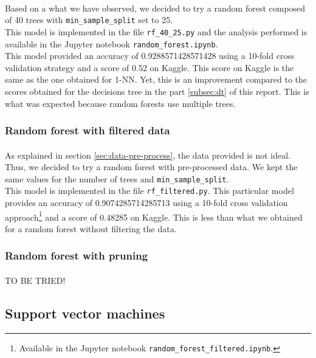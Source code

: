 \documentclass[a4paper, 11pt, oneside]{article}
\begin{document}
\paragraph{}Based on a what we have observed, we decided to try a random forest composed of 40 trees with \texttt{min\_sample\_split} set to 25.\\
This model is implemented in the file \texttt{rf\_40\_25.py} and the analysis performed is available in the Jupyter notebook \texttt{random\_forest.ipynb}.\\
This model provided an accuracy of 0.9288571428571428 using a 10-fold cross validation strategy and a score of 0.52 on Kaggle. This score on Kaggle is the same as the one obtained for 1-NN. Yet, this is an improvement compared to the scores obtained for the decisions tree in the part \ref{subsec:dt} of this report. This is what was expected because random forests use multiple trees.

\subsubsection{Random forest with filtered data}
\paragraph{}As explained in section \ref{sec:data-pre-process}, the data provided is not ideal. Thus, we decided to try a random forest with pre-processed data. We kept the same values for the number of trees and \texttt{min\_sample\_split}.\\
This model is implemented in the file \texttt{rf\_filtered.py}. This particular model provides an accuracy of 0.9074285714285713 using a 10-fold cross validation approach\footnote{Available in the Jupyter notebook \texttt{random\_forest\_filtered.ipynb}.} and a score of 0.48285 on Kaggle. This is less than what we obtained for a random forest without filtering the data.

\subsubsection{Random forest with pruning}
\paragraph{}TO BE TRIED!


\subsection{Support vector machines}
\end{document}
